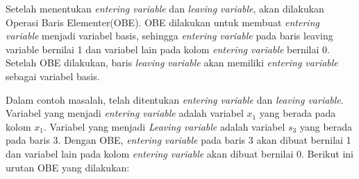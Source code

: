 Setelah menentukan \textit{entering variable} dan \textit{leaving variable}, akan dilakukan Operasi Baris Elementer(OBE). OBE dilakukan untuk membuat \textit{entering variable} menjadi variabel basis, sehingga \textit{entering variable} pada baris {leaving variable} bernilai 1 dan variabel lain pada kolom \textit{entering variable} bernilai 0. Setelah OBE dilakukan, baris \textit{leaving variable} akan memiliki \textit{entering variable} sebagai variabel basis.

Dalam contoh masalah, telah ditentukan \textit{entering variable} dan \textit{leaving variable}. Variabel yang menjadi \textit{entering variable} adalah variabel \(x_1\) yang berada pada kolom \(x_1\). Variabel yang menjadi \textit{Leaving variable} adalah variabel \(s_3\) yang berada pada baris 3. Dengan OBE, \textit{entering variable} pada baris 3 akan dibuat bernilai 1 dan variabel lain pada kolom \textit{entering variable} akan dibuat bernilai 0. Berikut ini urutan OBE yang dilakukan:
